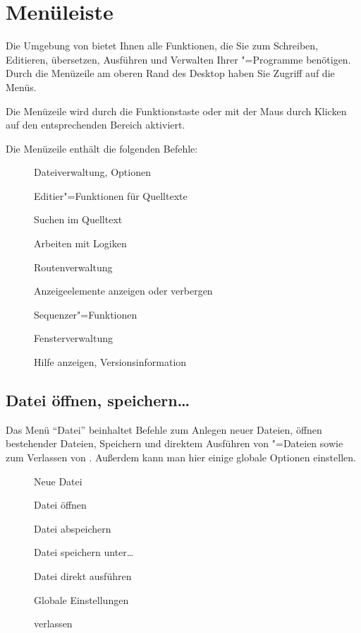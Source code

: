 \chapter{Menüleiste}
\label{sec:DE_MENU}
Die Umgebung von \mutabor{} bietet Ihnen alle Funktionen, die Sie zum
Schreiben, Editieren, übersetzen, Ausführen und Verwalten Ihrer
\mutabor{}"=Programme benötigen. Durch die Menüzeile am oberen Rand
des Desktop haben Sie Zugriff auf die Menüs.

Die Menüzeile wird durch die Funktionstaste  oder mit der 
Maus durch Klicken auf den entsprechenden Bereich aktiviert.

Die Menüzeile enthält die folgenden Befehle:
\begin{description}
\item[] Dateiverwaltung, Optionen
\item[] Editier"=Funktionen für Quelltexte
\item[] Suchen im Quelltext
\item[] Arbeiten mit Logiken
\item[] Routenverwaltung
\item[] Anzeigeelemente anzeigen oder verbergen
\item[] Sequenzer"=Funktionen
\item[] Fensterverwaltung
\item[] Hilfe anzeigen, Versionsinformation
\end{description}

\section{Datei öffnen, speichern\texorpdfstring\dots{...}}
\label{sec:MS_FILE}

Das Menü "`Datei"' beinhaltet Befehle zum Anlegen neuer Dateien, 
öffnen bestehender Dateien, Speichern und direktem Ausführen 
von \mutabor{}"=Dateien sowie zum Verlassen von \mutabor{}. 
Außerdem kann man hier einige globale Optionen einstellen.


\begin{description}
\item[] Neue Datei
\item[] Datei öffnen
\item[] Datei abspeichern
\item[] Datei speichern unter\dots
\item[] Datei direkt ausführen
\item[] Globale Einstellungen
\item[] \mutabor{} verlassen
\end{description}


